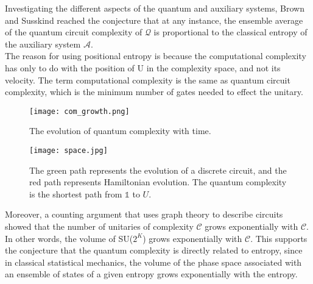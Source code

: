 

Investigating the different aspects of the quantum and auxiliary systems, Brown and Susskind \cite{brown2018second} reached the conjecture that at any instance, the ensemble average of the quantum circuit complexity of $\mathcal{Q}$ is proportional to the classical entropy of the auxiliary system $\mathcal{A}$.
\\
The reason for using positional entropy is because the computational complexity has only to do with the position of U in the complexity space, and not its velocity. The term computational complexity is the same as quantum circuit complexity, which is the minimum number of gates needed to effect the unitary.
\\\begin{figure}[H]
 \centering
 \begin{minipage}{0.45\linewidth}
  \texttt{[image: com\_growth.png]}
  \caption{The evolution of quantum complexity with time.}
 \end{minipage}\hfill
 \begin{minipage}{0.45\linewidth}
  \centering
  \texttt{[image: space.jpg]}
  \caption{The green path represents the evolution of a discrete circuit, and the red path represents Hamiltonian evolution. The quantum complexity is the shortest path from $\mathbb{1}$ to $\textit{U}$.}
 \end{minipage}
 
\end{figure}
Moreover, a counting argument that uses graph theory to describe circuits \cite{brown2018second} showed that the number of unitaries of complexity $\mathcal{C}$ grows exponentially with $\mathcal{C}$. In other words, the volume of SU($2^K$) grows exponentially with $\mathcal{C}$. This supports the conjecture that the quantum complexity is directly related to entropy, since in classical statistical mechanics, the volume of the phase space associated with an ensemble of states of a given entropy grows exponentially with the entropy.

